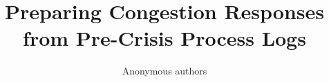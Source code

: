 \documentclass[runningheads]{llncs}
\begin{document}
\title{Preparing Congestion Responses from Pre-Crisis Process Logs}
\author{Anonymous authors}
\maketitle





\FloatBarrier
\label{maintextend}


\end{document}
